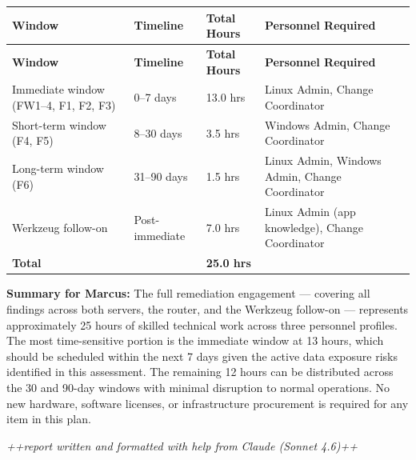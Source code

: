 \documentclass[12pt]{article}
\begin{document}
\noindent
\begin{longtable}{p{4.8cm} p{2.2cm} p{2.2cm} p{2.6cm}}
  \rowcolor{headercol}
  \color{white}\textbf{Window} &
  \color{white}\textbf{Timeline} &
  \color{white}\textbf{Total Hours} &
  \color{white}\textbf{Personnel Required} \\
  \endfirsthead
  \rowcolor{headercol}
  \color{white}\textbf{Window} &
  \color{white}\textbf{Timeline} &
  \color{white}\textbf{Total Hours} &
  \color{white}\textbf{Personnel Required} \\
  \endhead
  \midrule
 
  Immediate window (FW1--4, F1, F2, F3) &
  0--7 days &
  13.0 hrs &
  Linux Admin, Change Coordinator \\[4pt]
 
  Short-term window (F4, F5) &
  8--30 days &
  3.5 hrs &
  Windows Admin, Change Coordinator \\[4pt]
 
  Long-term window (F6) &
  31--90 days &
  1.5 hrs &
  Linux Admin, Windows Admin, Change Coordinator \\[4pt]
 
  Werkzeug follow-on &
  Post-immediate &
  7.0 hrs &
  Linux Admin (app knowledge), Change Coordinator \\[4pt]
 
  \rowcolor{totalrowcol}
  \textbf{Total} & & \textbf{25.0 hrs} & \\[2pt]
 
  \bottomrule
\end{longtable}
 
\bigskip
 
\begin{notebox}
\textbf{Summary for Marcus:} The full remediation engagement --- covering all
findings across both servers, the router, and the Werkzeug follow-on ---
represents approximately 25 hours of skilled technical work across three
personnel profiles. The most time-sensitive portion is the immediate window
at 13 hours, which should be scheduled within the next 7 days given the
active data exposure risks identified in this assessment. The remaining
12 hours can be distributed across the 30 and 90-day windows with minimal
disruption to normal operations. No new hardware, software licenses, or
infrastructure procurement is required for any item in this plan.
\end{notebox}

\vfill
\textit{++report written and formatted with help from Claude (Sonnet 4.6)++}
\end{document}
